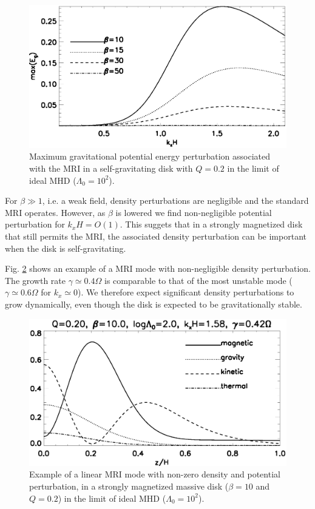 \begin{figure}
  \includegraphics[width=\linewidth]{figures/compare_energy_ideal}
  \caption{Maximum gravitational potential energy perturbation
    associated with the MRI in a self-gravitating disk with $Q=0.2$ in
    the limit of ideal MHD ($\Lambda_0=10^2$). 
    \label{gravity_energy}}
\end{figure}

For $\beta\gg 1$, i.e. a weak field, density perturbations are
negligible and the standard MRI operates. However, as $\beta$ is
lowered we find non-negligible potential perturbation for
$k_xH=O(1)$. This suggets that in a strongly magnetized disk that
still permits the MRI, the associated density perturbation can be
important when the disk is self-gravitating. 

Fig. \ref{mri_massive} shows an example of a MRI mode with
non-negligible density perturbation. The growth rate $\gamma\simeq
0.4\Omega$ is comparable to that of the most unstable mode
($\gamma\simeq 0.6\Omega$ for $k_x\simeq0$). 
We therefore expect significant density perturbations to grow
dynamically, even though the disk is expected to be gravitationally
stable. 

 
\begin{figure}
  \includegraphics[width=\linewidth]{figures/result_ideal_sg}
  \caption{Example of a linear MRI mode with non-zero density and
    potential perturbation, in a strongly magnetized massive disk
    ($\beta=10$ and $Q=0.2$) in the limit of ideal MHD
    ($\Lambda_0=10^2$).   
    \label{mri_massive}}
\end{figure}


